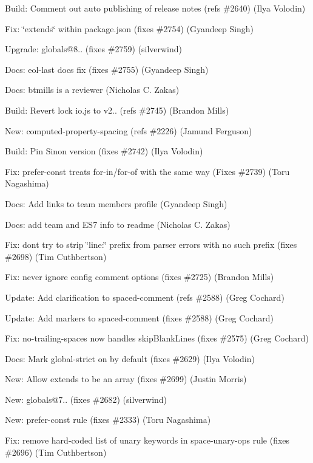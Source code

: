 \begin{DoxyItemize}
\item Build\+: Comment out auto publishing of release notes (refs \#2640) (Ilya Volodin)
\item Fix\+: \char`\"{}extends\char`\"{} within package.\+json (fixes \#2754) (Gyandeep Singh)
\item Upgrade\+: globals@8.. (fixes \#2759) (silverwind)
\item Docs\+: eol-\/last docs fix (fixes \#2755) (Gyandeep Singh)
\item Docs\+: btmills is a reviewer (Nicholas C. Zakas)
\item Build\+: Revert lock io.\+js to v2.. (refs \#2745) (Brandon Mills)
\item New\+: computed-\/property-\/spacing (refs \#2226) (Jamund Ferguson)
\item Build\+: Pin Sinon version (fixes \#2742) (Ilya Volodin)
\item Fix\+: {\ttfamily prefer-\/const} treats {\ttfamily for-\/in}/{\ttfamily for-\/of} with the same way (Fixes \#2739) (Toru Nagashima)
\item Docs\+: Add links to team members profile (Gyandeep Singh)
\item Docs\+: add team and E\+S7 info to readme (Nicholas C. Zakas)
\item Fix\+: don\textquotesingle{}t try to strip \char`\"{}line\+:\char`\"{} prefix from parser errors with no such prefix (fixes \#2698) (Tim Cuthbertson)
\item Fix\+: never ignore config comment options (fixes \#2725) (Brandon Mills)
\item Update\+: Add clarification to spaced-\/comment (refs \#2588) (Greg Cochard)
\item Update\+: Add markers to spaced-\/comment (fixes \#2588) (Greg Cochard)
\item Fix\+: no-\/trailing-\/spaces now handles skip\+Blank\+Lines (fixes \#2575) (Greg Cochard)
\item Docs\+: Mark global-\/strict on by default (fixes \#2629) (Ilya Volodin)
\item New\+: Allow extends to be an array (fixes \#2699) (Justin Morris)
\item New\+: globals@7.. (fixes \#2682) (silverwind)
\item New\+: {\ttfamily prefer-\/const} rule (fixes \#2333) (Toru Nagashima)
\item Fix\+: remove hard-\/coded list of unary keywords in space-\/unary-\/ops rule (fixes \#2696) (Tim Cuthbertson)

\end{DoxyItemize}
